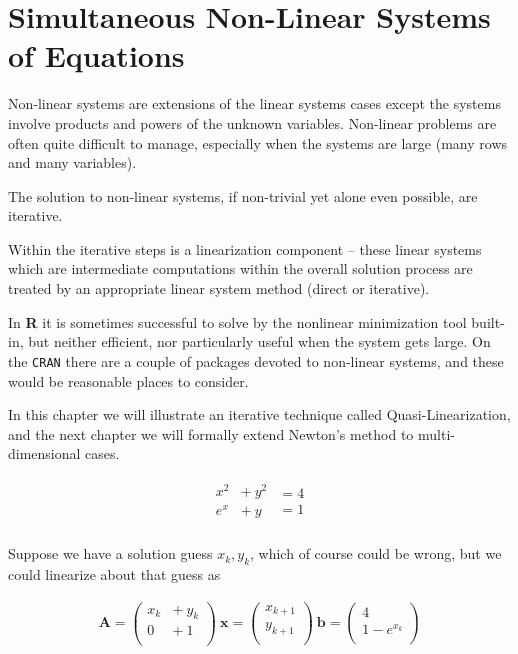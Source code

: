 \section{Simultaneous Non-Linear Systems of Equations}
Non-linear systems are extensions of the linear systems cases except the systems involve products and powers of the unknown variables.
Non-linear problems are often quite difficult to manage, especially when the systems are large (many rows and many variables).

The solution to non-linear systems, if non-trivial yet alone even possible, are iterative.  

Within the iterative steps is a linearization component -- these linear systems which are intermediate computations within the overall solution process are treated by an appropriate linear system method (direct or iterative). 

In \textbf{R} it is sometimes successful to solve by the nonlinear minimization tool built-in, but neither efficient, nor particularly useful when the system gets large. On the \texttt{CRAN} there are a couple of packages devoted to non-linear systems, and these would be reasonable places to consider.

In this chapter we will illustrate an iterative technique called Quasi-Linearization, and the next chapter we will formally extend Newton's method to multi-dimensional cases.

\begin{gather}
\begin{matrix}
x^2 & +~y^2  \\
 e^x & +~y  \\
\end{matrix}
\begin{matrix}
= 4\\
= 1\\
\end{matrix}
\end{gather}

Suppose we have a solution guess $x_{k},y_{k}$, which of course could be wrong, but we could linearize about that guess as

\begin{gather}
\mathbf{A} =
\begin{pmatrix}
x_k & + ~y_k  \\
0 & + ~1  \\
\end{pmatrix}
~\mathbf{x} = 
\begin{pmatrix}
x_{k+1} \\
y_{k+1} \\
\end{pmatrix}
~ \mathbf{b} = 
\begin{pmatrix}
4\\
1 - e^{x_k}\\
\end{pmatrix}
\end{gather}

